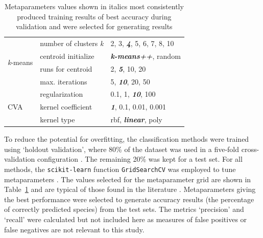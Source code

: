 \documentclass[a4paper, 11pt]{article}
\begin{document}
\begin{table}
\begin{center}
\begin{tabular}{l|l|l}
  \hline
  \multirow{4}{*}{\textit{k}-means} & number of clusters \textit{k}  & 2, 3, \textit{\textbf{4}}, 5, 6, 7, 8, 10\\
                                    & centroid initialize         & \textit{\textbf{k-means\small{++}}}, random\\
                                    & runs for centroid	     & 2, \textit{\textbf{5}}, 10, 20 \\
                                    & max. iterations           & 5, \textit{\textbf{10}}, 20, 50 \\
  \hline
    \multirow{3}{*}{CVA}            & regularization   & 0.1, 1, \textit{\textbf{10}}, 100 \\
                                    & kernel coefficient      & \textit{\textbf{1}}, 0.1, 0.01, 0.001 \\
                                    & kernel type                  & rbf, \textit{\textbf{linear}}, poly \\
  \hline
  \end{tabular}
  \vspace{-2\baselineskip} %
  \end{center} 
  \caption{\centering\linespread{0.8}\selectfont Metaparameters values shown in italics most consistently produced training results of 
  best accuracy during validation and were selected for generating results}
  \vspace{-1\baselineskip} %
  \label{tab:metaparameters}
\end{table} 

To reduce the potential for overfitting, the classification methods were trained using 
`holdout validation', where 80\% of the dataset was used in a five-fold cross-validation 
configuration \cite{james2013introduction}. The remaining 20\% was kept for a test set. For all methods, 
the \texttt{scikit-learn} function \texttt{GridSearchCV} was employed to tune metaparameters \cite{scikit-learn}. 
The values selected for the metaparameter grid are shown in Table~\ref{tab:metaparameters} and are typical of those found in the literature \cite{geron2019hands}. 
Metaparameters giving the best 
performance were selected to generate accuracy results (the percentage of correctly predicted species) 
from the test sets. The metrics `precision' and `recall' were calculated but not included here as measures of
false positives or false negatives are not relevant to this study.
\end{document}
